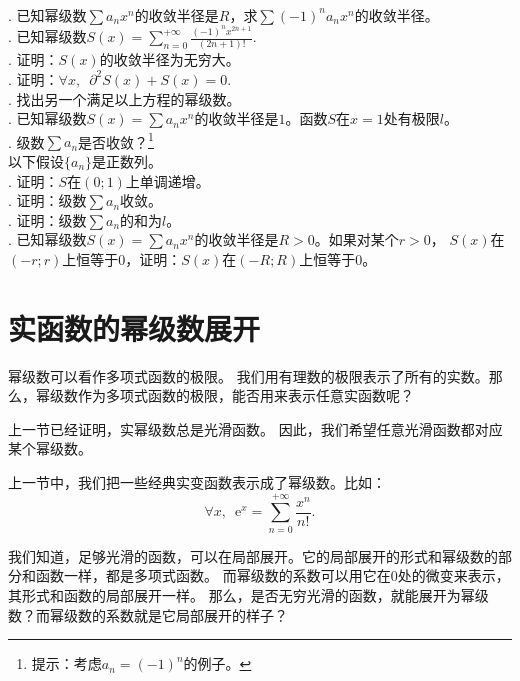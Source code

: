 \documentclass[12pt,UTF8]{ctexbook}
\begin{document}
\begin{xt}    
    \mbox{} \\
    . 已知幂级数$\sum a_n x^n$的收敛半径是$R$，求$\sum (-1)^n a_n x^n$的收敛半径。\\
    . 已知幂级数$S(x) = \sum_{n=0}^{+\infty} \frac{(-1)^n x^{2n+1}}{(2n+1)!}. $\\
    . 证明：$S(x)$的收敛半径为无穷大。\\
    . 证明：$\forall x,\,\,\,\partial^2 S(x) + S(x) = 0.$ \\
    . 找出另一个满足以上方程的幂级数。\\
    . 已知幂级数$S(x) = \sum a_n x^n$的收敛半径是$1$。函数$S$在$x=1$处有极限$l$。\\
    . 级数$\sum a_n$是否收敛？\footnote{提示：考虑$a_n = (-1)^n$的例子。}\\
    \indent 以下假设$\{a_n\}$是正数列。\\
    . 证明：$S$在$(0;1)$上单调递增。\\
    . 证明：级数$\sum a_n$收敛。\\
    . 证明：级数$\sum a_n$的和为$l$。\\
    . 已知幂级数$S(x) = \sum a_n x^n$的收敛半径是$R>0$。如果对某个$r>0$，
    $S(x)$在$(-r;r)$上恒等于$0$，证明：$S(x)$在$(-R;R)$上恒等于$0$。
\end{xt}

\section{实函数的幂级数展开}

幂级数可以看作多项式函数的极限。
我们用有理数的极限表示了所有的实数。那么，幂级数作为多项式函数的极限，能否用来表示任意实函数呢？

上一节已经证明，实幂级数总是光滑函数。
因此，我们希望任意光滑函数都对应某个幂级数。

上一节中，我们把一些经典实变函数表示成了幂级数。比如：
$$ \forall x, \,\,\, \mathrm{e}^x = \sum_{n=0}^{+\infty} \frac{x^n}{n!}. $$

我们知道，足够光滑的函数，可以在局部展开。它的局部展开的形式和幂级数的部分和函数一样，都是多项式函数。
而幂级数的系数可以用它在$0$处的微变来表示，其形式和函数的局部展开一样。
那么，是否无穷光滑的函数，就能展开为幂级数？而幂级数的系数就是它局部展开的样子？
\end{document}
